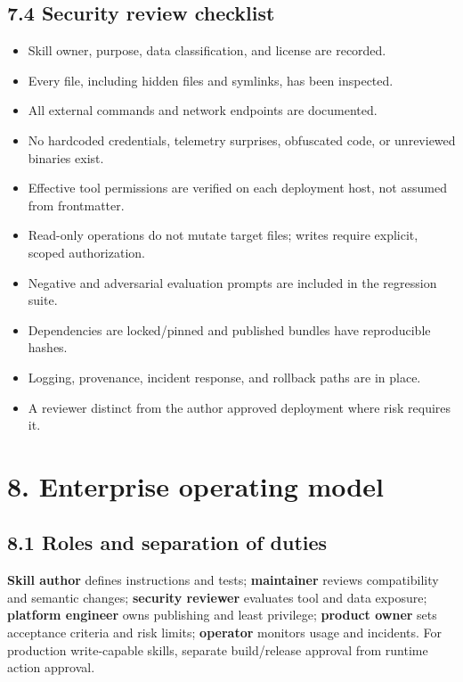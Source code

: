 \documentclass[
  10pt,
  letterpaper,
]{article}
\providecommand{\tightlist}{%
  \setlength{\itemsep}{0pt}\setlength{\parskip}{0pt}}
\begin{document}
\subsection{7.4 Security review
checklist}\label{security-review-checklist}

\begin{itemize}
\tightlist
\item[$\square$]
  Skill owner, purpose, data classification, and license are recorded.
\item[$\square$]
  Every file, including hidden files and symlinks, has been inspected.
\item[$\square$]
  All external commands and network endpoints are documented.
\item[$\square$]
  No hardcoded credentials, telemetry surprises, obfuscated code, or
  unreviewed binaries exist.
\item[$\square$]
  Effective tool permissions are verified on each deployment host, not
  assumed from frontmatter.
\item[$\square$]
  Read-only operations do not mutate target files; writes require
  explicit, scoped authorization.
\item[$\square$]
  Negative and adversarial evaluation prompts are included in the
  regression suite.
\item[$\square$]
  Dependencies are locked/pinned and published bundles have reproducible
  hashes.
\item[$\square$]
  Logging, provenance, incident response, and rollback paths are in
  place.
\item[$\square$]
  A reviewer distinct from the author approved deployment where risk
  requires it.
\end{itemize}

\section{8. Enterprise operating
model}\label{enterprise-operating-model}

\subsection{8.1 Roles and separation of
duties}\label{roles-and-separation-of-duties}

\textbf{Skill author} defines instructions and tests;
\textbf{maintainer} reviews compatibility and semantic changes;
\textbf{security reviewer} evaluates tool and data exposure;
\textbf{platform engineer} owns publishing and least privilege;
\textbf{product owner} sets acceptance criteria and risk limits;
\textbf{operator} monitors usage and incidents. For production
write-capable skills, separate build/release approval from runtime
action approval.
\end{document}
